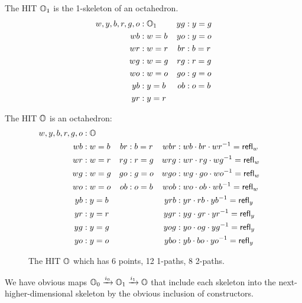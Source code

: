 \begin{mydef}
The HIT \( \mathbb{O}_1 \) is the 1-skeleton of an octahedron.
\begin{align*}
w, y, b, r, g, o &: \mathbb{O}_1 & yg &: y=g \\
wb &: w=b & yo &: y=o \\
wr &: w=r & br &: b=r \\
wg &: w=g & rg &: r=g \\
wo &: w=o & go &: g=o \\
yb &: y=b & ob &: o=b \\
yr &: y=r
\end{align*}
\end{mydef}

\begin{mydef}
The HIT \( \mathbb{O} \) is an octahedron:
\begin{align*}
w, y, b, r, g, o &: \mathbb{O} \\
wb &: w=b & br &: b=r & wbr &: wb\cdot br\cdot wr^{-1} = \mathsf{refl}_w \\
wr &: w=r & rg &: r=g & wrg &: wr\cdot rg\cdot wg^{-1} = \mathsf{refl}_w \\
wg &: w=g & go &: g=o & wgo &: wg\cdot go\cdot wo^{-1} = \mathsf{refl}_w \\
wo &: w=o & ob &: o=b & wob &: wo\cdot ob\cdot wb^{-1} = \mathsf{refl}_w \\
yb &: y=b & & & yrb &: yr\cdot rb\cdot yb^{-1} = \mathsf{refl}_y \\
yr &: y=r & & & ygr &: yg\cdot gr\cdot yr^{-1} = \mathsf{refl}_y \\
yg &: y=g & & & yog &: yo\cdot og\cdot yg^{-1} = \mathsf{refl}_y \\
yo &: y=o & & & ybo &: yb\cdot bo\cdot yo^{-1} = \mathsf{refl}_y 
\end{align*}
\end{mydef}

\begin{figure}[htbp]
\centering

\caption{The HIT \( \mathbb{O} \) which has 6 points, 12 1-paths, 8 2-paths.}
\end{figure}

We have obvious maps \( \mathbb{O}_0\xrightarrow[]{i_0} \mathbb{O}_1\xrightarrow[]{i_1} \mathbb{O} \) that include each skeleton into the next-higher-dimensional skeleton by the obvious inclusion of constructors.
